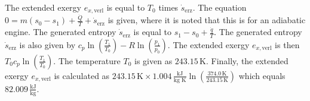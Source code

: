 The extended exergy \( e_{x, \text{verl}} \) is equal to \( T_0 \) times \( \dot{s}_{\text{erz}} \).
The equation \( 0 = m (s_0 - s_1) + \frac{\dot{Q}}{T} + \dot{s}_{\text{erz}} \) is given, where it is noted that this is for an adiabatic engine.
The generated entropy \( \dot{s}_{\text{erz}} \) is equal to \( s_1 - s_0 + \frac{\dot{q}}{T} \).
The generated entropy \( \dot{s}_{\text{erz}} \) is also given by \( c_p \ln \left( \frac{T_1}{T_0} \right) - R \ln \left( \frac{p_1}{p_0} \right) \).
The extended exergy \( e_{x, \text{verl}} \) is then \( T_0 c_p \ln \left( \frac{T_1}{T_0} \right) \).
The temperature \( T_0 \) is given as \( 243.15 \, \text{K} \).
Finally, the extended exergy \( e_{x, \text{verl}} \) is calculated as \( 243.15 \, \text{K} \times 1.004 \, \frac{\text{kJ}}{\text{kg K}} \ln \left( \frac{374.0 \, \text{K}}{243.15 \, \text{K}} \right) \) which equals \( 82.009 \, \frac{\text{kJ}}{\text{kg}} \).